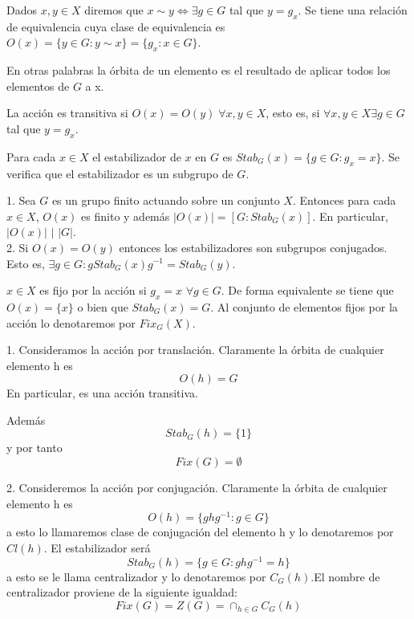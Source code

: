 \begin{definition}
Dados $x,y \in X$ diremos que $x \sim y \iff \exists g \in G$ tal que $y = g_x$. Se tiene una relación de equivalencia cuya clase de equivalencia es $O(x) = \{y \in G:y \sim x\} = \{g_x:x \in G\}$.

En otras palabras la órbita de un elemento es el resultado de aplicar todos los elementos de $G$ a x. 

La acción es transitiva si $O(x) = O(y) \; \forall x,y \in X$, esto es, si $\forall x,y \in X \exists g \in G$ tal que $y = g_x$.
\end{definition}

\begin{definition}[Estabilizador]
Para cada $x \in X$ el estabilizador de $x$ en $G$ es $Stab_G(x) = \{g \in G:g_x = x\}$. Se verifica que el estabilizador es un subgrupo de $G$.
\end{definition}

\begin{proposition}
1. Sea $G$ es un grupo finito actuando sobre un conjunto $X$. Entonces para cada $x \in X$, $O(x)$ es finito y además $|O(x)| = [G:Stab_G(x)]$. En particular, $|O(x)|$ $|$ $|G|$.\\
2. Si $O(x) = O(y)$ entonces los estabilizadores son subgrupos conjugados. Esto es, $\exists g \in G:g Stab_G(x) g^{-1} = Stab_G(y)$.
\end{proposition}

\begin{definition}
$x \in X$ es fijo por la acción si $g_x = x$ $\forall g \in G$. De forma equivalente se tiene que $O(x) = \{x\}$ o bien que $Stab_G(x) = G$. Al conjunto de elementos fijos por la acción lo denotaremos por $Fix_G(X)$.
\end{definition}

\begin{example}
1. Consideramos la acción por translación. Claramente la órbita de cualquier elemento h es $$O(h) = G$$ En particular, es una acción transitiva. 

Además $$Stab_G(h) = \{1\}$$ y por tanto $$Fix(G) = \emptyset$$

2. Consideremos la acción por conjugación. Claramente la órbita de cualquier elemento h es $$O(h) = \{ghg^{-1}:g \in G\}$$ a esto lo llamaremos clase de conjugación del elemento h y lo denotaremos por $Cl(h)$. El estabilizador será $$Stab_G(h) = \{g \in G:ghg^{-1}  = h\}$$ a esto se le llama centralizador y lo denotaremos por $C_G(h)$.El nombre de centralizador proviene de la siguiente igualdad: $$Fix(G) = Z(G) = \cap_{h \in G} C_G(h)$$ 
 \end{example}
